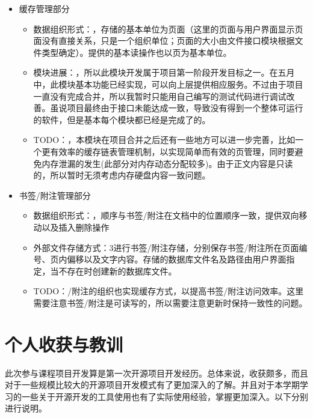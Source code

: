 \documentclass[a4paper,12pt]{article}
\begin{document}
\begin{CJK*}{UTF8}{song}
	\begin{itemize}
		\item{{缓存管理部分}}
			\begin{itemize}
				\item{数据组织形式：，存储的基本单位为页面（这里的页面与用户界面显示页面没有直接关系，只是一个组织单位；页面的大小由文件接口模块根据文件类型确定）。提供的基本读操作也以页为基本单位。}
				\item{模块进展：，所以此模块开发属于项目第一阶段开发目标之一。在五月中，此模块基本功能已经实现，可以向上层提供相应服务。不过由于项目一直没有完成合并，所以我暂时只能用自己编写的测试代码进行调试改善。虽说项目最终由于接口未能达成一致，导致没有得到一个整体可运行的软件，但是基本每个模块都已经是完成了的。}
				\item{TODO：，本模块在项目合并之后还有一些地方可以进一步完善，比如一个更有效率的缓存链表管理机制，以实现简单而有效的页管理，同时要避免内存泄漏的发生(此部分对内存动态分配较多)。由于正文内容是只读的，所以暂时无须考虑内存硬盘内容一致问题。}
			\end{itemize}
		\item{{书签/附注管理部分}}
			\begin{itemize}
				\item{数据组织形式：，顺序与书签/附注在文档中的位置顺序一致，提供双向移动以及插入删除操作}
				\item{外部文件存储方式：3进行书签/附注存储，分别保存书签/附注所在页面编号、页内偏移以及文字内容。存储的数据库文件名及路径由用户界面指定，当不存在时创建新的数据库文件。}
				\item{TODO：/附注的组织也实现缓存方式，以提高书签/附注访问效率。这里需要注意书签/附注是可读写的，所以需要注意更新时保持一致性的问题。}
			\end{itemize}
	\end{itemize}

	\section{\large{个人收获与教训}}
	此次参与课程项目开发算是第一次开源项目开发经历。总体来说，收获颇多，而且对于一些规模比较大的开源项目开发模式有了更加深入的了解。并且对于本学期学习的一些关于开源开发的工具使用也有了实际使用经验，掌握更加深入。以下分别进行说明。


\end{CJK*}
\end{document}
